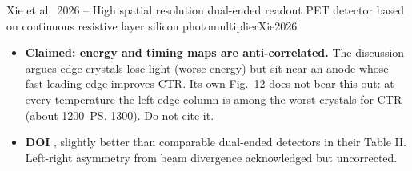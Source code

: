 \begin{papernote}{Xie et al.\ 2026 -- High spatial resolution dual-ended readout PET detector based on continuous resistive layer silicon photomultiplier}{Xie2026}
\begin{itemize}
		\textbf{Under-sold: the spread exceeds the resolution it perturbs.}
	\item \textbf{Claimed: energy and timing maps are anti-correlated.} The
		discussion argues edge crystals lose light (worse energy) but sit near an
		anode whose fast leading edge improves CTR. Its own Fig.\ 12 does not
		bear this out: at every temperature the left-edge column is among the
		worst crystals for CTR (about 1200--\ps{1300}). Do not cite it.
	\item \textbf{DOI }, slightly better than comparable
		dual-ended detectors in their Table II. Left-right asymmetry from beam
		divergence acknowledged but uncorrected.
\end{itemize}
 

\end{papernote}

